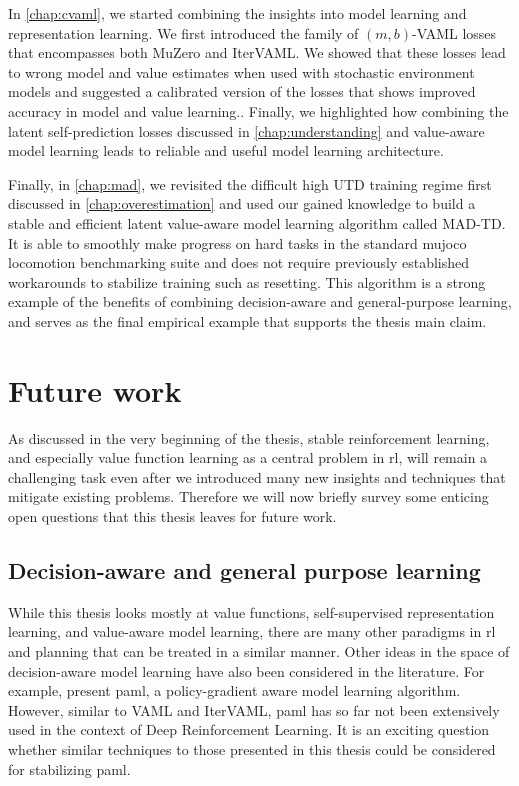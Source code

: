 In \autoref{chap:cvaml}, we started combining the insights into model learning and representation learning.
We first introduced the family of $(m,b)$-VAML losses that encompasses both MuZero and IterVAML.
We showed that these losses lead to wrong model and value estimates when used with stochastic environment models and suggested a calibrated version of the losses that shows improved accuracy in model and value learning..
Finally, we highlighted how combining the latent self-prediction losses discussed in \autoref{chap:understanding} and value-aware model learning leads to reliable and useful model learning architecture.

Finally, in \autoref{chap:mad}, we revisited the difficult high UTD training regime first discussed in \autoref{chap:overestimation} and used our gained knowledge to build a stable and efficient latent value-aware model learning algorithm  called MAD-TD. 
It is able to smoothly make progress on hard tasks in the standard mujoco locomotion benchmarking suite and does not require previously established workarounds to stabilize training such as resetting.
This algorithm is a strong example of the benefits of combining decision-aware and general-purpose learning, and serves as the final empirical example that supports the thesis main claim.


\section{Future work}


As discussed in the very beginning of the thesis, stable reinforcement learning, and especially value function learning as a central problem in \ac{rl}, will remain a challenging task even after we introduced many new insights and techniques that mitigate existing problems.
Therefore we will now briefly survey some enticing open questions that this thesis leaves for future work.

\subsection{Decision-aware and general purpose learning}

While this thesis looks mostly at value functions, self-supervised representation learning, and value-aware model learning, there are many other paradigms in \ac{rl} and planning that can be treated in a similar manner.
Other ideas in the space of decision-aware model learning have also been considered in the literature.
For example, \textcite{abachi2020policy} present \ac{paml}, a policy-gradient aware model learning algorithm.
However, similar to VAML and IterVAML, \ac{paml} has so far not been extensively used in the context of Deep Reinforcement Learning.
It is an exciting question whether similar techniques to those presented in this thesis could be considered for stabilizing \ac{paml}.

